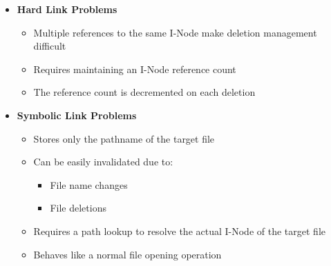 \documentclass[8pt,twocolumn]{article}
\begin{document}
\vspace{-0.6em}
\begin{itemize}
  \small
  \setlength{\itemsep}{0pt} %
  \setlength{\parskip}{0pt}
  \vspace{-0.6em}
  \item \textbf{Hard Link Problems}
  \vspace{-0.4em}
  \begin{itemize}
    \setlength{\itemsep}{0pt} %
    \setlength{\parskip}{0pt}
      \item Multiple references to the same I-Node make deletion management difficult
      \item Requires maintaining an I-Node reference count
      \item The reference count is decremented on each deletion
  \end{itemize}
  \vspace{-0.4em}
  \item \textbf{Symbolic Link Problems}\vspace{-0.4em}
  \begin{itemize}
    \setlength{\itemsep}{0pt} %
    \setlength{\parskip}{0pt}
      \item Stores only the pathname of the target file
      \item Can be easily invalidated due to:
      \begin{itemize}
        \setlength{\itemsep}{0pt} %
        \setlength{\parskip}{0pt}
          \item File name changes
          \item File deletions
      \end{itemize}
      \vspace{-0.4em}
      \item Requires a path lookup to resolve the actual I-Node of the target file
      \item Behaves like a normal file opening operation
  \end{itemize}\vspace{-0.6em}
\end{itemize}
\vspace{-0.6em}
\noindent{}
\end{document}
